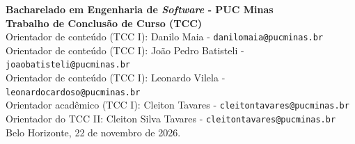 \documentclass[12pt]{article}
\begin{document}
\begin{tcolorbox}
\footnotesize
\textbf{Bacharelado em Engenharia de \emph{Software} - PUC Minas\\
Trabalho de Conclusão de Curso (TCC)} \\[2pt]
Orientador de conteúdo (TCC I): Danilo Maia - \texttt{danilomaia@pucminas.br} \\
Orientador de conteúdo (TCC I): João Pedro Batisteli - \texttt{joaobatisteli@pucminas.br} \\
Orientador de conteúdo (TCC I): Leonardo Vilela - \texttt{leonardocardoso@pucminas.br} \\
Orientador acadêmico (TCC I): Cleiton Tavares - \texttt{cleitontavares@pucminas.br} \\
Orientador do TCC II: Cleiton Silva Tavares - \texttt{cleitontavares@pucminas.br} \\
Belo Horizonte, 22 de novembro de 2026.
\end{tcolorbox}












\end{document}
